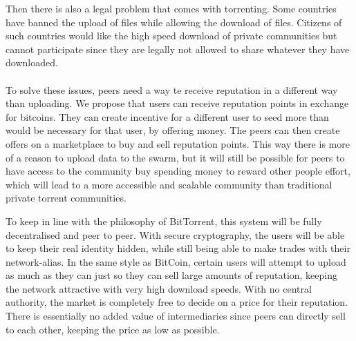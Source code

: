 Then there is also a legal problem that comes with torrenting. Some countries have banned the upload of files while allowing the download of files.
Citizens of such countries would like the high speed download of private communities but cannot participate since they are legally not allowed to share whatever they have downloaded.\\
\\
To solve these issues, peers need a way te receive reputation in a different way than uploading. We propose that users can receive reputation points in exchange for bitcoins. 
They can create incentive for a different user to seed more than would be necessary for that user, by offering money.
The peers can then create offers on a marketplace to buy and sell reputation points.
This way there is more of a reason to upload data to the swarm, but it will still be possible for peers to have access to the community buy spending money to reward other people effort, which will lead to a more accessible and scalable community than traditional private torrent communities.

To keep in line with the philosophy of BitTorrent, this system will be fully decentralised and peer to peer.
With secure cryptography, the users will be able to keep their real identity hidden, while still being able to make trades with their network-alias. 
In the same style as BitCoin, certain users will attempt to upload as much as they can just so they can sell large amounts of reputation, keeping the network attractive with very high download speeds.
With no central authority, the market is completely free to decide on a price for their reputation. There is essentially no added value of intermediaries since peers can directly sell to each other, keeping the price as low as possible.

